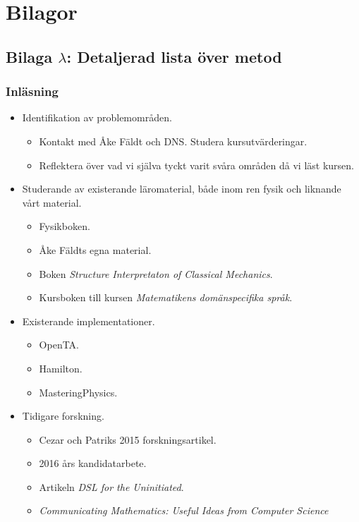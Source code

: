 \documentclass[12pt,a4paper]{article}
\begin{document}
\newpage
{}




\newpage
\section*{Bilagor}
\label{sec:bilaga}

\subsection*{Bilaga $\lambda$: Detaljerad lista över metod}

\subsubsection*{Inläsning}

\begin{itemize}
    \item Identifikation av problemområden.
        \begin{itemize}
            \item Kontakt med Åke Fäldt och DNS. Studera kursutvärderingar.
            \item Reflektera över vad vi själva tyckt varit svåra områden då vi
          läst kursen.  \end{itemize}
    \item Studerande av existerande läromaterial, både inom ren fysik och liknande vårt material.
        \begin{itemize}
            \item Fysikboken.
            \item Åke Fäldts egna material.
            \item Boken \textit{Structure Interpretaton of Classical Mechanics}\cite{SICM}.
            \item Kursboken till kursen \textit{Matematikens domänspecifika språk}.
        \end{itemize}
    \item Existerande implementationer.
        \begin{itemize}
            \item OpenTA.
            \item Hamilton.
            \item MasteringPhysics.
        \end{itemize}
    \item Tidigare forskning.
        \begin{itemize}
            \item Cezar och Patriks 2015 forskningsartikel.
            \item 2016 års kandidatarbete.
            \item Artikeln \textit{DSL for the Uninitiated}.
            \item \textit{Communicating Mathematics: Useful Ideas from Computer Science}
        \end{itemize}
\end{itemize}
\end{document}
